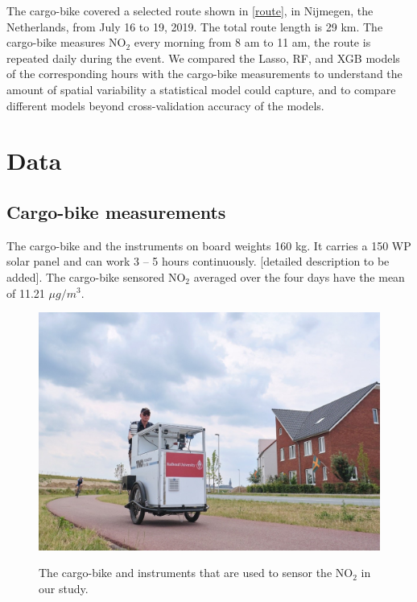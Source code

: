 \documentclass{article}
\begin{document}
The cargo-bike covered a selected route shown in \cref{route}, in Nijmegen, the Netherlands, from July 16 to 19, 2019. The total route length is 29 km. The cargo-bike measures NO$_2$ every morning from 8 am to 11 am, the route is repeated daily during the event. We compared the Lasso, RF, and XGB models of the corresponding hours with the cargo-bike measurements to understand the amount of spatial variability a statistical model could capture, and to compare different models beyond cross-validation accuracy of the models.  

\section{Data}

\subsection{Cargo-bike measurements}
The cargo-bike and the instruments on board weights 160 kg. It carries a 150 WP solar panel and can work 3 – 5 hours continuously. [detailed description to be added]. 
The cargo-bike sensored NO$_2$ averaged over the four days have the mean of 11.21 $\mu g/m^3$. 

\begin{figure}[H]
    \includegraphics[width=\linewidth]{f1a.jpg}
    \label{bike}
    \caption {The cargo-bike and instruments that are used to sensor the NO$_2$ in our study.}
\end{figure}
\end{document}
